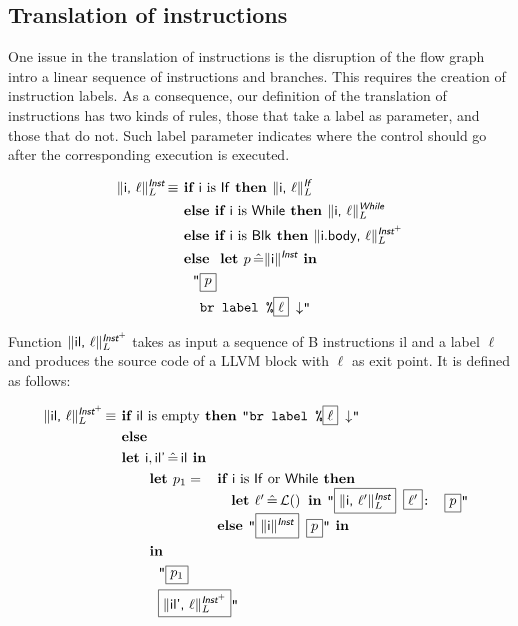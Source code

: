 \documentclass{article}
\newcommand{\trad}[2]{\ensuremath{\lVert \textsf{#1} \rVert^{\textit{#2}}}}
\newcommand{\nl}[0]{\ensuremath{\downarrow}}
\DeclareMathOperator{\isdef}{\equiv}
\DeclareMathOperator{\lbl}{\mathcal{L}()}
\newcommand{\llvm}[1]{\texttt{#1}}
\newcommand{\B}[1]{\textsf{#1}}
\newcommand{\ListOf}[1]{$\mbox{#1}^+$}
\newcommand{\IF}[0]{\textbf{ if }}
\newcommand{\ELSIF}[0]{\textbf{ else if }}
\newcommand{\ELSE}[0]{\textbf{ else }}
\newcommand{\THEN}[0]{\textbf{ then }}
\newcommand{\LET}[0]{\textbf{ let }}
\DeclareMathOperator{\BE}{\hat{=}}
\newcommand{\IN}[0]{\textbf{ in }}
\newcommand{\PH}[1]{\framebox{$#1$}}
\begin{document}
\subsection{Translation of instructions}
\label{sec:trad-instr}

One issue in the translation of instructions is the disruption of the flow graph
intro a linear sequence of instructions and branches. This requires the creation
of instruction labels. As a consequence, our definition of the translation of
instructions has two kinds of rules, those that take a label as parameter, and
those that do not. Such label parameter indicates where the control should go
after the corresponding execution is executed.

\begin{align*}
\trad{\B{i}, $\ell$}{\B{Inst}}_L \isdef
& \IF \B{i} \mbox{ is \B{If}} \THEN \trad{\B{i}, $\ell$}{\B{If}}_L \\
& \ELSIF \B{i} \mbox{ is \B{While}} \THEN \trad{\B{i}, $\ell$}{\B{While}}_L \\
& \ELSIF \B{i} \mbox{ is \B{Blk}} \THEN \trad{\B{i.body}, $\ell$}{\ListOf{\B{Inst}}}_L \\
& \ELSE \LET p \BE \trad{\B{i}}{\B{Inst}} \IN \\
& \quad \llvm{"\PH{p}} \\
& \quad \llvm{ br label \%\PH{\ell} \nl"}
\end{align*}

Function $\trad{\B{il}, $\ell$}{\ListOf{\B{Inst}}}_L$ takes as input a sequence
of B instructions \B{il} and a label $\ell$ and produces the source code of a
LLVM block with $\ell$ as exit point. It is defined as follows:

\begin{align*}
\trad{\B{il}, $\ell$}{\ListOf{\B{Inst}}}_L \isdef & \IF \B{il} \mbox{ is empty} \THEN \llvm{"br label \%\PH{\ell} \nl"} \\
& \ELSE \\
& \LET \B{i}, \B{il'} \BE \B{il}  \IN \\
& \quad \quad \LET p_1 =
\begin{array}[t]{l}
  \IF \B{i} \mbox{ is \B{If} or \B{While}} \THEN \\
  \quad \LET \ell' \BE \lbl \IN \llvm{"\PH{\trad{i, $\ell'$}{\B{Inst}}_L} \PH{\ell'}: \PH{p}"} \\
  \ELSE \llvm{"\PH{\trad{i}{\B{Inst}}} \PH{p}"} \IN
\end{array} \\
& \quad \quad \IN \\
& \quad \quad \quad \llvm{"\PH{p_1}} \\
& \quad \quad \quad \llvm{\PH{\trad{il', $\ell$}{\ListOf{\B{Inst}}}_L}"}
\end{align*}
\end{document}
